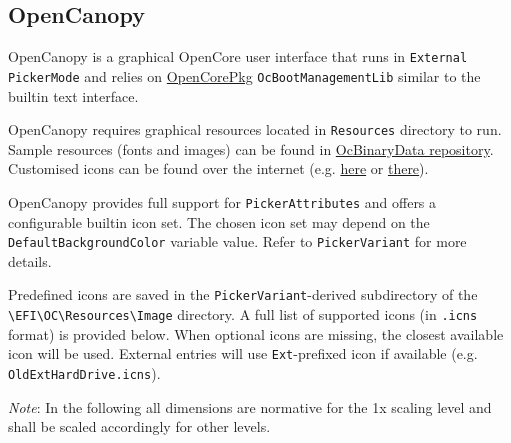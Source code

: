 \documentclass[]{article}
\makeatletter
\renewcommand{\label}[1]{%
\zref@wrapper@immediate{\oldlabel{#1}}}  %
\makeatother
\begin{document}
\subsection{OpenCanopy}\label{ueficanopy}

OpenCanopy is a graphical OpenCore user interface that runs in
\texttt{External} \texttt{PickerMode} and relies on
\href{https://github.com/acidanthera/OpenCorePkg}{OpenCorePkg} \texttt{OcBootManagementLib}
similar to the builtin text interface.

OpenCanopy requires graphical resources located in \texttt{Resources} directory to run.
Sample resources (fonts and images) can be found in
\href{https://github.com/acidanthera/OcBinaryData}{OcBinaryData repository}. Customised icons can be found over the internet
(e.g. \href{https://github.com/blackosx/OpenCanopyIcons}{here} or \href{https://applelife.ru/threads/kastomizacija-opencanopy.2945020/}{there}).

OpenCanopy provides full support for \texttt{PickerAttributes} and offers a configurable
builtin icon set. The chosen icon set may depend on the \texttt{DefaultBackgroundColor}
variable value. Refer to \texttt{PickerVariant} for more details.

Predefined icons are saved in the \texttt{PickerVariant}-derived subdirectory of the
\texttt{\textbackslash EFI\textbackslash OC\textbackslash Resources\textbackslash Image}
directory. A full list of supported icons (in \texttt{.icns} format) is provided below. When optional icons
are missing, the closest available icon will be used. External entries will use \texttt{Ext}-prefixed
icon if available (e.g. \texttt{OldExtHardDrive.icns}).

\emph{Note}: In the following all dimensions are normative for the 1x scaling level and shall be
scaled accordingly for other levels.
\end{document}
